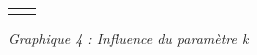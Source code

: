\documentclass[
  11pt,
]{article}
\begin{document}
\begin{center}
\begin{tabular}{cc}
\begin{minipage}{0.5\linewidth}
\end{minipage} \end{tabular}

\end{center}

\emph{Graphique 4 : Influence du paramètre k}
\end{document}
